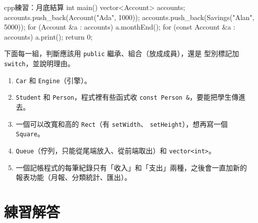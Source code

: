 \begin{drills}[label=drills:ch7]
\begin{code}{cpp}{練習：月底結算}
int main() {
    vector<Account> accounts;
    accounts.push_back(Account("Ada", 1000));
    accounts.push_back(Savings("Alan", 5000));
    for (Account &a : accounts) {
        a.monthEnd();
    }
    for (const Account &a : accounts) {
        a.print();
    }
    return 0;
}
\end{code}
\item 下面每一組，判斷應該用 \texttt{public} 繼承、組合（放成成員），還是
型別標記加 \texttt{switch}，並說明理由。
\begin{enumerate}
\item \texttt{Car} 和 \texttt{Engine}（引擎）。
\item \texttt{Student} 和 \texttt{Person}，程式裡有些函式收
\texttt{const Person \&}，要能把學生傳進去。
\item 一個可以改寬和高的 \texttt{Rect}（有 \texttt{setWidth}、
\texttt{setHeight}），想再寫一個 \texttt{Square}。
\item \texttt{Queue}（佇列，只能從尾端放入、從前端取出）和
\texttt{vector<int>}。
\item 一個記帳程式的每筆紀錄只有「收入」和「支出」兩種，之後會一直加新的
報表功能（月報、分類統計、匯出）。
\end{enumerate}
\end{drills}

\section*{練習解答}

